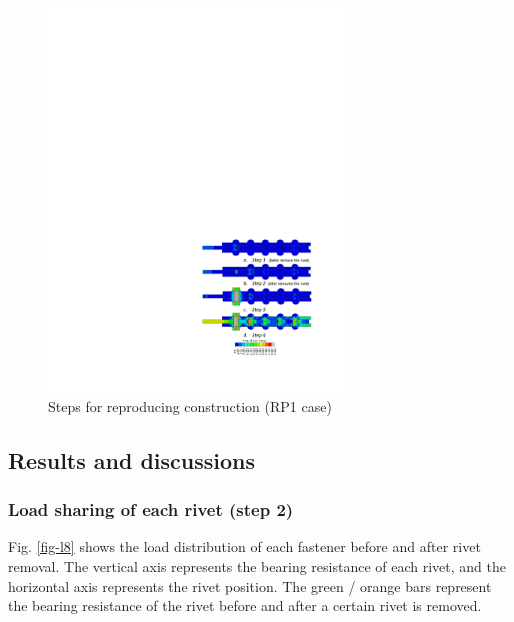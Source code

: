 \begin{figure}[htbp]
    \centering
    \includegraphics[width=0.7\textwidth]{imgs/ch4/fig-l7.pdf}
    \caption{Steps for reproducing construction (RP1 case)}
    \label{fig-l7}
\end{figure}

\subsection{Results and discussions}

\subsubsection{Load sharing of each rivet (step 2)}

Fig. \ref{fig-l8} shows the load distribution of each fastener before and after rivet removal. The vertical axis represents the bearing resistance of each rivet, and the horizontal axis represents the rivet position. The green / orange bars represent the bearing resistance of the rivet before and after a
certain rivet is removed.

